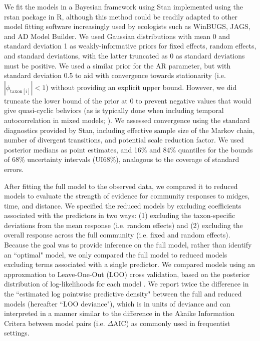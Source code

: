 We fit the models in a Bayesian framework using Stan \citep{Carpenter2017}
implemented using the rstan \citep{Stan2018} package in R,
although this method could be readily adapted to other model fitting software
increasingly used by ecologists such as WinBUGS, JAGS, and AD Model Builder.
We used Gaussian distributions with mean 0 and standard deviation 1 as
weakly-informative priors \citep{Gelman2017}
for fixed effects, random effects, and standard deviations,
with the latter truncated as 0 as standard deviations must be positive.
We used a similar prior for the AR parameter, but with standard deviation 0.5 to aid with
convergence towards stationarity (i.e. $|\phi_{\text{taxon}[i]}|<1$) without
providing an explicit upper bound.
However, we did truncate the lower bound of the prior at 0 to prevent negative
values that would give quasi-cyclic behviors (as is typically done when
including temporal autocorrelation in mixed models; \citep{Zuur2009}).
We assessed convergence using the standard diagnostics provided by Stan,
including effective sample size of the Markov chain, number of divergent
transitions, and potential scale reduction factor. We used posterior medians as point
estimates, and 16\% and 84\% quantiles
for the bounds of 68\% uncertainty intervals (UI68\%),
analogous to the coverage of standard errors.

After fitting the full model to the observed data, we compared it to reduced models
to evaluate the strength of evidence for community responses to midges, time,
and distance.
We specified the reduced models by excluding coefficients associated with the
predictors in two ways: (1) excluding the taxon-specific deviations from the mean
response (i.e. random effects) and (2) excluding the overall response across the
full community (i.e. fixed and random effects).
Because the goal was to provide inference on the full model, rather than identify
an ``optimal" model, we only compared the full model to reduced models
excluding terms associated with a single predictor.
We compared models using an approxmation to Leave-One-Out (LOO) cross validation,
based on the posterior distribution of log-likelihoods for each model
\citep{Vehtari2017}.
We report twice the difference in the ``estimated log pointwise predictive density"
between the full and reduced models (hereafter ``LOO deviance"), which is in units of
deviance and can interpreted in a manner similar to the difference in the
Akaike Information Critera between model pairs (i.e. $\Delta$AIC) as
commonly used in frequentist settings.

